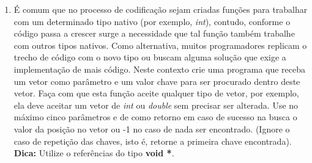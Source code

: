 \documentclass[a4paper,10pt]{article}
\begin{document}
\begin{enumerate}
  \item É comum que no processo de codificação sejam criadas funções 
    para trabalhar com um determinado tipo nativo (por exemplo, \emph{int}), 
    contudo, conforme o código passa a crescer surge a necessidade que
    tal função também trabalhe com outros tipos nativos. Como alternativa, 
    muitos programadores replicam o trecho de código com o novo tipo ou buscam 
    alguma solução que exige a implementação de mais código. Neste contexto  
    crie uma programa que receba um vetor como parâmetro e um valor chave para 
    ser procurado dentro deste vetor. Faça com que esta função aceite qualquer 
    tipo de vetor, por exemplo, ela deve aceitar um vetor de \emph{int} ou 
    \emph{double} sem precisar ser alterada. Use no máximo cinco parâmetros e de 
    como retorno em caso de sucesso na busca o valor da posição no vetor ou -1 
    no caso de nada ser encontrado. (Ignore o caso de repetição das chaves, 
    isto é, retorne a primeira chave encontrada).\\
    \textbf{Dica:} Utilize o referências do tipo \textbf{void *}.

\end{enumerate}
\end{document}
